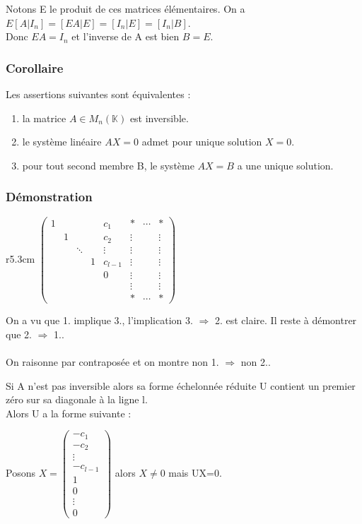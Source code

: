 \documentclass[a4paper,10pt]{book} %
\newcommand{\K}{\mathbb{K}}
\begin{document}
Notons E le produit de ces matrices élémentaires. On a $E[A|I_n]=[EA|E]=[I_n|E]=[I_n|B]$.\\
Donc $EA=I_n$ et l’inverse de A est bien $B=E$.

\subsubsection{Corollaire}
Les assertions suivantes sont équivalentes :
\begin{enumerate}
\item la matrice $A\in M_n(\K)$ est inversible.
\item le système linéaire $AX=0$ admet pour unique solution $X=0$.
\item pour tout second membre B, le système $AX=B$ a une unique solution.
\end{enumerate}

\subsubsection{Démonstration}
\begin{wrapfigure}[6]{r}{5.3cm} $\begin{pmatrix}
1 & && & c_1 & * & \cdots & * \\
& 1 &&& c_2 & \vdots & & \vdots \\
&& \ddots && \vdots & \vdots && \vdots \\
&&& 1 & c_{l-1} & \vdots & & \vdots \\
&&&& 0 & \vdots & & \vdots \\
&&&&& \vdots & & \vdots \\
&&&&& * & \cdots & *
\end{pmatrix}$ \end{wrapfigure}
On a vu que 1. implique 3., l'implication 3. $\Rightarrow$ 2. est claire. Il reste à démontrer que 2. $\Rightarrow$ 1..\\\\
On raisonne par contraposée et on montre non 1. $\Rightarrow$ non 2..\bigskip

Si A n'est pas inversible alors sa forme échelonnée réduite U contient un premier zéro sur sa diagonale à la ligne l. \\

Alors U a la forme suivante :

\newpage

Posons $X=\begin{pmatrix}
-c_1 \\
-c_2 \\
\vdots \\
-c_{l-1} \\
1 \\
0 \\
\vdots \\
0
\end{pmatrix}$ alors $X\neq 0$ mais UX=0.\\
\end{document}
